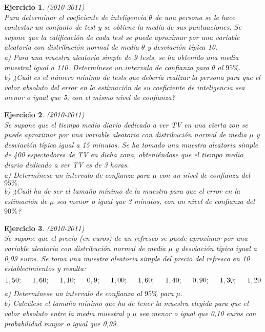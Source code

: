 \documentclass[12pt, a4paper]{amsart}
\newtheorem{ejer}{Ejercicio}
\begin{document}
\begin{ejer}\em (2010-2011)\\
Para determinar el coeficiente de inteligencia $\theta$ de una persona se le hace contestar un conjunto de test y se obtiene la media de sus puntuaciones. Se supone que la calificación de cada test se puede aproximar por una variable aleatoria con distribución normal de media $\theta$ y desviación típica 10.\\
a) Para una muestra aleatoria simple de 9 tests, se ha obtenido una media muestral igual a 110. Determínese un intervalo de confianza para $\theta$ al $95\%.$\\
b) ¿Cuál es el número mínimo de tests que debería realizar la persona para que el valor absoluto del error en la estimación de su coeficiente de inteligencia sea menor o igual que 5, con el mismo nivel de confianza?
\end{ejer}

\begin{ejer}\em (2010-2011)\\
Se supone que el tiempo medio diario dedicado a ver TV en una cierta zon se puede aproximar por una variable aleatoria con distribución normal de media $\mu$ y desviación típica igual a 15 minutos. Se ha tomado una muestra aleatoria simple de 400 espectadores de TV en dicha zona, obteniéndose que el tiempo medio diario dedicado a ver TV es de 3 horas.\\
a) Determínese un intervalo de confianza para $\mu$ con un nivel de confianza del $95\%.$\\
b) ¿Cuál ha de ser el tamaño mínimo de la muestra para que el error en la estimación de $\mu$ sea menor o igual que 3 minutos, con un nivel de confianza del $90\%$?
\end{ejer}

\begin{ejer}\em (2010-2011)\\
Se supone que el precio (en euros) de un refresco se puede aproximar por una variable aleatoria con distribución normal de media $\mu$ y desviación típica igual a 0,09 euros. Se toma una muestra aleatoria simple del precio del refresco en 10 establecimientos y resulta:
\[1,50; \hspace*{5mm}1,60; \hspace*{5mm}1,10; \hspace*{5mm}0,9; \hspace*{5mm}1,00; \hspace*{5mm}1,60; \hspace*{5mm}1,40; \hspace*{5mm}0,90; \hspace*{5mm}1,30; \hspace*{5mm}1,20\]
a) Determínese un intervalo de confianza al $95\%$ para $\mu.$\\
b) Calcúlese el tamaño mínimo que ha de tener la muestra elegida para que el valor absoluto entre la media muestral y $\mu$ sea menor o igual que 0,10 euros con probabilidad mayor o igual que 0,99.
\end{ejer}
\end{document}
